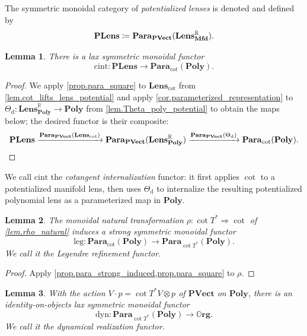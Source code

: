 \documentclass[11pt, oneside, article]{memoir}
\theoremstyle{definition}
\theoremstyle{plain}
\newtheorem{lemma}[lemma]{Lemma}
\newenvironment{definition}
  {\pushQED{\qed}\renewcommand{\qedsymbol}{$\lozenge$}\definitionx}
  {\popQED\enddefinitionx}
\newcommand{\Cat}[1]{\mathbf{#1}}%
\newcommand{\fun}[1]{\mathrm{#1}}%
\newcommand{\To}[2][]{\xrightarrow[#1]{#2}}
\newcommand{\rr}{\mathbb{R}}
\newcommand{\poly}{\Cat{Poly}}
\newcommand{\org}{{\mathbb{O}\Cat{rg}}}
\newcommand{\mfd}{\Cat{Mfd}}
\newcommand{\potlens}{\Cat{PLens}}
\newcommand{\Para}{\Cat{Para}}
\newcommand{\para}[2]{\Para_{#1}(#2)}
\newcommand{\pvect}{\Cat{PVect}}
\newcommand{\Lens}[1]{\Cat{Lens}_{#1}}
\newcommand{\lmfd}{\Lens{\mfd}}
\newcommand{\potd}{\fun{d}}
\newcommand{\cint}{\fun{cint}}
\newcommand{\leg}{\fun{leg}}
\newcommand{\dyn}{\fun{dyn}}
\begin{document}
\begin{definition}\label{def.potlens}
The symmetric monoidal category of \emph{potentialized lenses} is denoted and defined by
\[
\potlens\coloneqq\para{\pvect}{\lmfd^\rr}.
\qedhere
\]
\end{definition}

\begin{lemma}\label{lem.potlens_to_para_poly}
There is a lax symmetric monoidal functor
\[
\cint\colon\potlens\to\para{\cot}{\poly}.
\]
\end{lemma}

\begin{proof}
We apply \cref{prop.para_square} to $\Lens\cot$ from \cref{lem.cot_lifts_lens_potential} and apply \cref{cor.parameterized_representation} to $\Theta_{\potd}\colon\Lens{\poly}^\rr\to\poly$ from
\cref{lem.Theta_poly_potential} to obtain the maps below; the desired functor is their composite:
\[
\potlens\To{\para\pvect{\Lens\cot}}
\para{\pvect}{\Lens\poly^\rr}\To{\para\pvect{\Theta_{\potd}}}
\para{\cot}{\poly}.
\qedhere
\]
\end{proof}
We call $\cint$ the \emph{cotangent internalization} functor: it first applies $\cot$ to a potentialized manifold lens, then uses $\Theta_{\potd}$ to internalize the resulting potentialized polynomial lens as a parameterized map in $\poly$.


\begin{lemma}\label{lem.para_rho}
The monoidal natural transformation $\rho\colon\cot{T^*}\Rightarrow\cot$ of \cref{lem.rho_natural} induces a strong symmetric monoidal functor
\[
\leg\colon\para{\cot}{\poly}\to\para{\cot{T^*}}{\poly}.
\]
We call it the \emph{Legendre refinement} functor.
\end{lemma}

\begin{proof}
Apply \cref{prop.para_strong_induced,prop.para_square} to $\rho$.
\end{proof}

\begin{lemma}\label{lem.poly_to_org}
With the action $V\cdot p=\cot{T^*V}\otimes p$ of $\pvect$ on $\poly$, there is an identity-on-objects lax symmetric monoidal functor
\[
\dyn\colon\para{\cot{T^*}}{\poly}\to\org.
\]
We call it the \emph{dynamical realization} functor.
\end{lemma}
\end{document}
